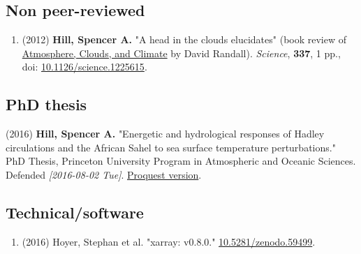 \documentclass{article}
\begin{document}
\subsection*{Non peer-reviewed}
\label{sec:orgheadline9}
\begin{enumerate}
\item (2012) \textbf{Hill, Spencer A.} "A head in the clouds elucidates" (book review of
\href{http://press.princeton.edu/titles/9773.html}{Atmosphere, Clouds, and Climate} by David Randall). \emph{Science}, \textbf{337}, 1 pp., doi:
\href{http://dx.doi.org/10.1126/science.1225615}{10.1126/science.1225615}.
\end{enumerate}
\subsection*{PhD thesis}
\label{sec:orgheadline10}
(2016) \textbf{Hill, Spencer A.} "Energetic and hydrological responses of Hadley
circulations and the African Sahel to sea surface temperature perturbations."
PhD Thesis, Princeton University Program in Atmospheric and Oceanic Sciences.
Defended \textit{[2016-08-02 Tue]}.  \href{http://search.proquest.com.ezproxy.princeton.edu/pqdtglobal/docview/1831357756/abstract/522E2D42A8BF49C0PQ/1}{Proquest version}.
\subsection*{Technical/software}
\label{sec:orgheadline11}
\begin{enumerate}
\item (2016) Hoyer, Stephan et al.  "xarray: v0.8.0."  \href{http://dx.doi.org/10.5281/zenodo.59499}{10.5281/zenodo.59499}.
\end{enumerate}
\end{document}
